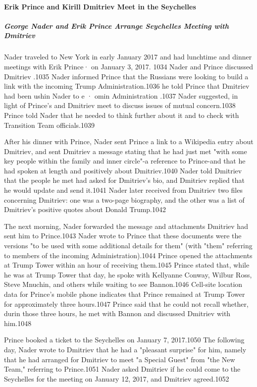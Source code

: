 \paragraph{Erik Prince and Kirill Dmitriev Meet in the Seychelles}

\subparagraph{George Nader and Erik Prince Arrange Seychelles Meeting with Dmitriev}

Nader traveled to New York in early January 2017 and had lunchtime and dinner meetings with Erik Prince· on January 3, 2017. 1034 Nader and Prince discussed Dmitriev .1035 Nader informed Prince that the Russians were looking to build a link with the incoming Trump Administration.1036 he told Prince that Dmitriev had been ushin Nader to e  · omin Administration .1037 Nader suggested, in light of Prince's and Dmitriev meet to discuss issues of mutual concern.1038 Prince told Nader that he needed to think further about it and to check with Transition Team officials.1039

After his dinner with Prince, Nader sent Prince a link to a Wikipedia entry about Dmitriev, and sent Dmitriev a message stating that he had just met "with some key people within the family and inner circle"-a  reference to Prince-and that he had spoken at length and positively about Dmitriev.1040 Nader told Dmitriev that the people he met had asked for Dmitriev's bio, and Dmitriev replied that he would update and send it.1041 Nader later received from Dmitriev two files concerning Dmitriev: one was a two-page biography,  and the other was a  list of Dmitriev's positive quotes about Donald Trump.1042

The next morning, Nader forwarded the message and attachments Dmitriev had sent him to Prince.1043 Nader wrote to Prince that these documents were the versions "to be used with some additional details for them" (with "them" referring to members of the incoming Administration).1044 Prince opened the attachments at Trump Tower within an hour of receiving them.1045 Prince stated that, while he was at Trump Tower that day, he spoke with Kellyanne Conway, Wilbur Ross, Steve Mnuchin, and others while waiting to see Bannon.1046 Cell-site location data for Prince's mobile phone indicates that Prince remained at Trump Tower for approximately three hours.1047 Prince said that he could not recall whether,  durin those three hours, he met with Bannon and discussed Dmitriev with him.1048

Prince booked a ticket to the Seychelles on January 7, 2017.1050 The following day, Nader wrote to Dmitriev that he had a  "pleasant surprise" for him, namely that he had arranged for Dmitriev to meet "a Special Guest" from "the New Team," referring to Prince.1051 Nader asked Dmitriev if  he could come to the Seychelles for the meeting on January 12,  2017, and Dmitriev agreed.1052

